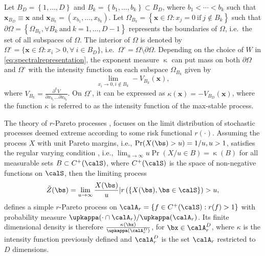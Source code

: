 \documentclass[12pt]{article}
\begin{document}
Let $B_D = \left\{ 1, \ldots, D \right\}$ and $B_k = \left\{ b_1, \ldots, b_k\right\} \subset B_D$, where $b_1 < \cdots < b_k$ such that $\bm x_{B_D} \equiv \bm x$ and $\bm x_{B_k} = \left( x_{b_1}, \ldots, x_{b_k}\right)$. Let $\Omega_{B_k} = \left\{ \bm x \in \Omega: x_j=0\ \text{if}\  j \notin B_k \right\}$
such that $\partial\Omega = \left\{ \Omega_{B_k}, \forall B_k \ \text{and}\ k=1, \ldots, D-1 \right\}$ represents the boundaries of $\Omega$, i.e.~the set of all subspaces of $\Omega$. The interior of $\Omega$ is denoted by $\Omega^\circ = \{\bm x\in \Omega: x_i>0,\forall\ i \in B_D\}$, i.e.~$\Omega^\circ = \Omega \setminus \partial \Omega$. Depending on the choice of $W$ in \eqref{eq:spectralrepresentation}, the exponent measure $\upkappa$ can put mass on both $\partial\Omega$ and $\Omega^\circ$ with the intensity function on each subspace $\Omega_{B_k}$ given by 
\begin{equation}
    \label{eq:angular_density}
        \lim_{x_i\to 0, i\notin B_k} - V_{B_k}(\bm x),
\end{equation}
where $V_{B_k} = \frac{\partial^k V}{\partial x_{b_1}\dots\partial x_{b_k}}$. On $\Omega^\circ$, it can be expressed as 
$\kappa(\bm x)= - V_{B_D}(\bm x)$,
where the function $\kappa$ is referred to as the intensity function of the max-stable process.


The theory of $r$-Pareto processes \citep{Dombry.Ribatet:2015, deFondeville.Davison:2022}, focuses on the limit distribution of stochastic processes deemed extreme according to some risk functional $r(\cdot)$.
Assuming the process $X$ with unit Pareto margins, i.e., $\Pr(X(\bs)>u)=1/u,u>1$, satisfies the regular varying condition \citep[see][]{Dombry.Ribatet:2015}, i.e., $\lim_{u\to\infty}u\Pr(X/u \in B)=\upkappa(B)$ for all measurable sets $B\subset C^+(\calS)$, where $C^+(\calS)$ is the space of non-negative functions on $\calS$, then the limiting process
%
\begin{align}
\label{eq:rpp}    
\tilde{Z}(\bs) = \lim_{u\rightarrow \infty} \frac{X(\bs)}{u}  \vert r\left(\{X(\bs),\bs\in\calS\} \right) >u,
\end{align}
%
defines a simple $r$-Pareto process on $\calA_r = \left\{ f \in C^+(\calS): r(f) > 1\right\}$ with probability measure $\upkappa(\cdot \cap \calA_r)/ \upkappa(\calA_r)$. 
Its finite dimensional density is therefore
%
$\frac{\kappa(\bx)}{\upkappa(\calA_r^D)}$, for $\bx \in \calA_r^D$,
%
where $\kappa$ is the intensity function previously defined and $\calA_r^D$ is the set $\calA_r$ restricted to $D$ dimensions. 
\end{document}
